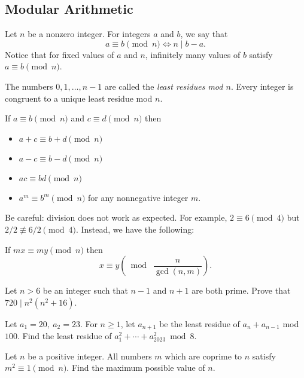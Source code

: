 \subsection{Modular Arithmetic}
  Let $n$ be a nonzero integer. For integers $a$ and $b$, we say that
  \[a\equiv b\pmod n\iff n\mid b-a.\]
  Notice that for fixed values of $a$ and $n$, infinitely many values of $b$
  satisfy $a\equiv b\pmod n$.

  The numbers $0,1,\ldots,n-1$ are called the \emph{least residues mod $n$}. 
  Every integer is congruent to a unique least residue mod $n$.
\begin{result}{\label{r:i:n:m:1}}
  If $a\equiv b\pmod n$ and $c\equiv d\pmod n$ then
  \begin{itemize}
    \item $a+c\equiv b+d\pmod n$
    \item $a-c\equiv b-d\pmod n$
    \item $ac\equiv bd\pmod n$
    \item $a^m\equiv b^m\pmod n$ for any nonnegative integer $m$.
  \end{itemize}
\end{result}
Be careful: division does not work as expected. For example, $2\equiv 6\pmod 4$
but $2/2\not\equiv 6/2\pmod 4$. Instead, we have the following:
\begin{result}{\label{r:i:n:m:2}}
    If $mx\equiv my\pmod n$ then \[x\equiv y\left(\bmod\;\frac n{\gcd(n,m)}\right).\]
\end{result}
\begin{problem}{\label{p:i:n:m:1}}
  Let $n>6$ be an integer such that $n-1$ and $n+1$ are both prime. Prove
    that $720\mid n^2(n^2+16)$.
\end{problem}
\begin{problem}{\label{p:i:n:m:2}}
  Let $a_1=20,\ a_2=23$. For $n\ge 1$, let $a_{n+1}$ be the least residue
    of $a_n+a_{n-1}$ mod $100$. Find the least residue of
    $a_1^2+\cdots+a_{2023}^2\bmod 8$.
\end{problem}
\begin{problem}{\label{p:i:n:m:3}}
  Let $n$ be a positive integer. All numbers $m$ which are coprime to $n$
    satisfy $m^2\equiv 1\pmod n$. Find the maximum possible value of $n$.
\end{problem}
